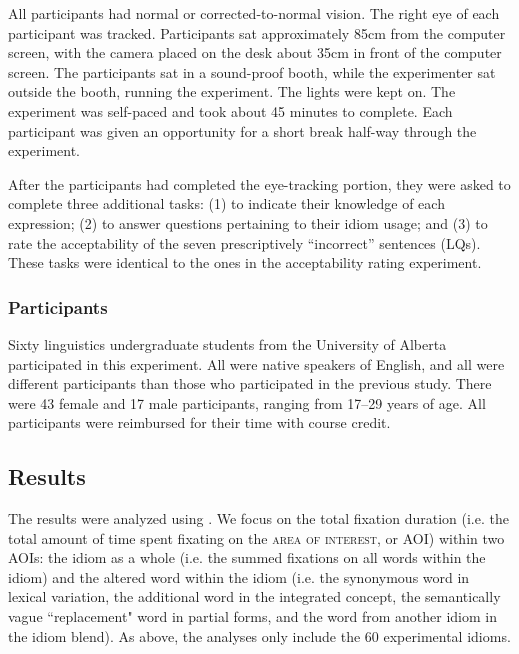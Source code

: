 \documentclass[output=paper
,modfonts
,nonflat]{langsci/langscibook}
\begin{document}
All participants had normal or corrected-to-normal vision. The right eye of each participant was tracked. Participants sat approximately 85cm from the computer screen, with the camera placed on the desk about 35cm in front of the computer screen. The participants sat in a sound-proof booth, while the experimenter sat outside the booth, running the experiment. The lights were kept on. The experiment was self-paced and took about 45 minutes to complete. Each participant was given an opportunity for a short break half-way through the experiment.

After the participants had completed the eye-tracking portion, they were asked to complete three additional tasks: (1) to indicate their knowledge of each expression; (2) to answer questions pertaining to their idiom usage; and (3) to rate the acceptability of the seven prescriptively ``incorrect'' sentences (LQs). These tasks were identical to the ones in the acceptability rating experiment.



\subsubsection{Participants}

Sixty linguistics undergraduate students from the University of Alberta participated in this experiment. All were native speakers of English, and all were different participants than those who participated in the previous study. There were 43 female and 17 male participants, ranging from 17--29 years of age. All participants were reimbursed for their time with course credit.



\subsection{Results}

The results were analyzed using . We focus on the total fixation duration (i.e. the total amount of time spent fixating on the \textsc{area of interest}, or AOI) within two AOIs: the idiom as a whole (i.e. the summed fixations on all words within the idiom) and the altered word within the idiom (i.e. the synonymous word in lexical variation, the additional word in the integrated concept, the semantically vague ``replacement" word in partial forms, and the word from another idiom in the idiom blend). As above, the analyses only include the 60 experimental idioms. %
\end{document}
